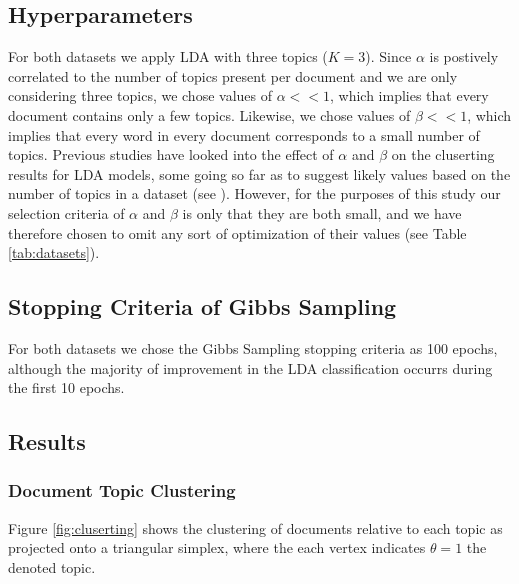 \documentclass[10pt]{article}
\begin{document}
%
%
\subsection{Hyperparameters}
For both datasets we apply LDA with three topics ($K = 3$). Since $\alpha$ is postively correlated to the number of topics present per document and we are only considering three topics, we chose values of $\alpha << 1$, which implies that every document contains only a few topics. Likewise, we chose values of $\beta << 1$, which implies that every word in every document corresponds to a small number of topics. Previous studies have looked into the effect of $\alpha$ and $\beta$ on the cluserting results for LDA models, some going so far as to suggest likely values based on the number of topics in a dataset (see \cite{Griffiths2004}). However, for the purposes of this study our selection criteria of $\alpha$ and $\beta$ is only that they are both small, and we have therefore chosen to omit any sort of optimization of their values (see Table \ref{tab:datasets}).


%
%
\subsection{Stopping Criteria of Gibbs Sampling}
For both datasets we chose the Gibbs Sampling stopping criteria as 100 epochs, although the majority of improvement in the LDA classification occurrs during the first 10 epochs.


%
%
\subsection{Results}

\subsubsection{Document Topic Clustering}
Figure \ref{fig:cluserting} shows the clustering of documents relative to each topic as projected onto a triangular simplex, where the each vertex indicates $\theta = 1$ the denoted topic.
\end{document}
